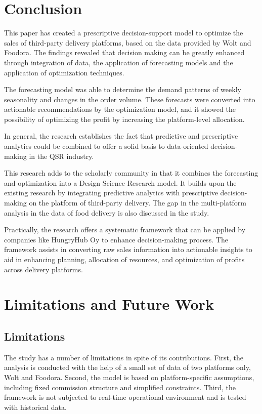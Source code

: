 \section{Conclusion}

This paper has created a prescriptive decision-support model to optimize the sales of third-party delivery platforms, based on the data provided by Wolt and Foodora. The findings revealed that decision making can be greatly enhanced through integration of data, the application of forecasting models and the application of optimization techniques. 

The forecasting model was able to determine the demand patterns of weekly seasonality and changes in the order volume. These forecasts were converted into actionable recommendations by the optimization model, and it showed the possibility of optimizing the profit by increasing the platform-level allocation. 

In general, the research establishes the fact that predictive and prescriptive analytics could be combined to offer a solid basis to data-oriented decision-making in the QSR industry. 

This research adds to the scholarly community in that it combines the forecasting and optimization into a Design Science Research model. It builds upon the existing research by integrating predictive analytics with prescriptive decision-making on the platform of third-party delivery. The gap in the multi-platform analysis in the data of food delivery is also discussed in the study. 

Practically, the research offers a systematic framework that can be applied by companies like HungryHub Oy to enhance decision-making process. The framework assists in converting raw sales information into actionable insights to aid in enhancing planning, allocation of resources, and optimization of profits across delivery platforms.


\section{Limitations and Future Work}

\subsection{Limitations}

The study has a number of limitations in spite of its contributions. First, the analysis is conducted with the help of a small set of data of two platforms only, Wolt and Foodora. Second, the model is based on platform-specific assumptions, including fixed commission structure and simplified constraints. Third, the framework is not subjected to real-time operational environment and is tested with historical data.


